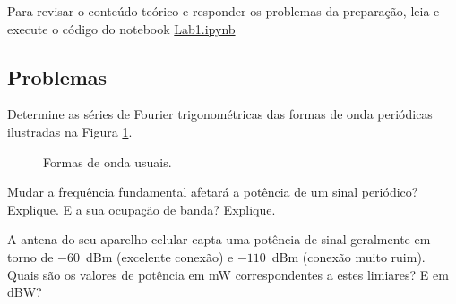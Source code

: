 \documentclass[12pt,addpoints]{exam}
\begin{document}
Para revisar o conteúdo teórico e responder os problemas da preparação, leia e execute o código do notebook \href{https://github.com/edsonportosilva/LPC/blob/master/Jupyter/Lab1/Lab1.ipynb}{Lab1.ipynb}

\subsection{Problemas}

\begin{questions}
    \question Determine as séries de Fourier trigonométricas das formas de onda periódicas ilustradas na Figura \ref{fig:sinaisusuais}.
    \begin{figure}[htb]
        \centering
        \label{subfig:ondaquadrada}
        \qquad
        \qquad
        \caption{Formas de onda usuais.}
        \label{fig:sinaisusuais}
    \end{figure}

	\question Mudar a frequência fundamental afetará a potência de um sinal periódico? Explique. E a sua ocupação de banda? Explique.
    
    \question A antena do seu aparelho celular capta uma potência de sinal geralmente em torno de $-60$~dBm (excelente conexão) e $-110$~dBm (conexão muito ruim). Quais são os valores de potência em mW correspondentes a estes limiares? E em dBW?
  \end{questions}
\end{document}
